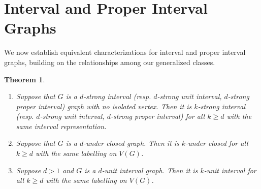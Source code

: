 \documentclass[12pt,reqno]{amsart}
\theoremstyle{plain}
\newtheorem{theorem}{Theorem}[section]
\theoremstyle{definition}
\numberwithin{equation}{section}
\begin{document}
\section{Interval and Proper Interval Graphs}
We now establish equivalent characterizations for interval and proper interval graphs, building on the relationships among our generalized classes.

\begin{theorem}\label{1.4}
\begin{enumerate}
\item Suppose that $G$ is a $d$-strong interval (resp. $d$-strong unit interval, $d$-strong proper interval) graph with no isolated vertex. Then it is $k$-strong interval (resp. $d$-strong unit interval, $d$-strong proper interval) for all $k\geq d$ with the same interval representation.

\item Suppose that $G$ is a $d$-under closed graph. Then it is $k$-under closed for all $k\geq d$ with the same labelling on $V(G)$.

\item Suppose $d>1$ and $G$ is a $d$-unit interval graph. Then it is $k$-unit interval for all $k\geq d$ with the same labelling on $V(G)$.
\end{enumerate}
\end{theorem}
\end{document}
